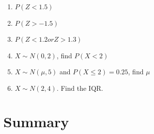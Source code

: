 \documentclass[
  letterpaper,
  DIV=11,
  numbers=noendperiod,
  oneside]{scrreprt}
\providecommand{\tightlist}{%
  \setlength{\itemsep}{0pt}\setlength{\parskip}{0pt}}\usepackage{longtable,booktabs,array}
\begin{document}
\begin{enumerate}
\def\labelenumi{\arabic{enumi}.}
\tightlist
\item
  \(P(Z < 1.5)\)
\item
  \(P(Z > -1.5)\)
\item
  \(P(Z < 1.2 or Z > 1.3)\)
\item
  \(X\sim N(0,2)\), find \(P(X < 2)\)
\item
  \(X\sim N(\mu, 5)\) and \(P(X \le 2) = 0.25\), find \(\mu\)
\item
  \(X \sim N(2, 4)\). Find the IQR.
\end{enumerate}

\hypertarget{summary-2}{%
\section{Summary}\label{summary-2}}
\end{document}
